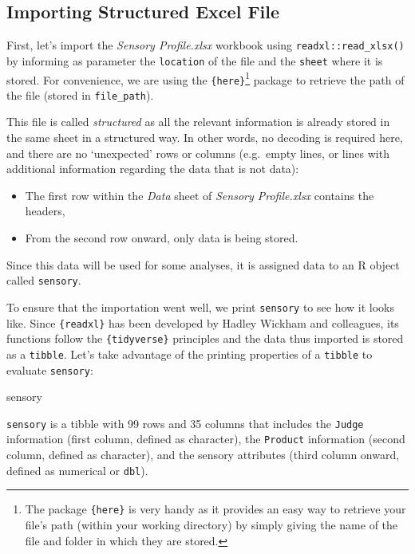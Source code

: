 \documentclass[
]{book}
\newenvironment{Shaded}{\begin{snugshade}}{\end{snugshade}}
\newcommand{\NormalTok}[1]{#1}
\providecommand{\tightlist}{%
  \setlength{\itemsep}{0pt}\setlength{\parskip}{0pt}}
\begin{document}
\hypertarget{importing-structured-excel-file}{%
\subsection{Importing Structured Excel File}\label{importing-structured-excel-file}}

First, let's import the \emph{Sensory Profile.xlsx} workbook using \texttt{readxl::read\_xlsx()} by informing as parameter the \texttt{location} of the file and the \texttt{sheet} where it is stored. For convenience, we are using the \texttt{\{here\}}\footnote{The package \texttt{\{here\}} is very handy as it provides an easy way to retrieve your file's path (within your working directory) by simply giving the name of the file and folder in which they are stored.} package to retrieve the path of the file (stored in \texttt{file\_path}).

This file is called \emph{structured} as all the relevant information is already stored in the same sheet in a structured way. In other words, no decoding is required here, and there are no `unexpected' rows or columns (e.g.~empty lines, or lines with additional information regarding the data that is not data):

\begin{itemize}
\tightlist
\item
  The first row within the \emph{Data} sheet of \emph{Sensory Profile.xlsx} contains the headers,\\
\item
  From the second row onward, only data is being stored.
\end{itemize}

Since this data will be used for some analyses, it is assigned data to an R object called \texttt{sensory}.

To ensure that the importation went well, we print \texttt{sensory} to see how it looks like. Since \texttt{\{readxl\}} has been developed by Hadley Wickham and colleagues, its functions follow the \texttt{\{tidyverse\}} principles and the data thus imported is stored as a \texttt{tibble}. Let's take advantage of the printing properties of a \texttt{tibble} to evaluate \texttt{sensory}:

\begin{Shaded}
\begin{Highlighting}[]
\NormalTok{sensory}
\end{Highlighting}
\end{Shaded}

\texttt{sensory} is a tibble with 99 rows and 35 columns that includes the \texttt{Judge} information (first column, defined as character), the \texttt{Product} information (second column, defined as character), and the sensory attributes (third column onward, defined as numerical or \texttt{dbl}).
\end{document}
